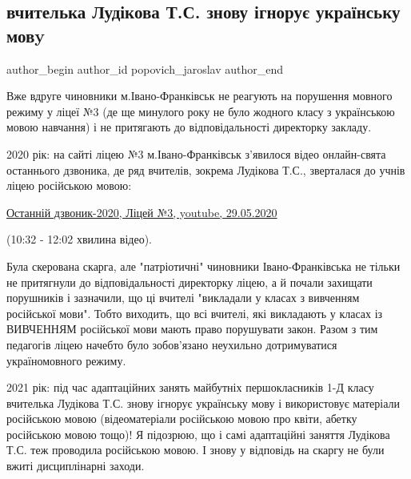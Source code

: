  
 
 
 
 
 
\subsection{вчителька Лудікова Т.С. знову ігнорує українську мовy}
\label{sec:05_08_2021.fb.popovich_jaroslav.1.mova_shkola_ivano_frankovsk}
 
\ifcmt
 author_begin
   author_id popovich_jaroslav
 author_end
\fi

Вже вдруге чиновники м.Івано-Франківськ не реагують на порушення мовного режиму
у ліцеї №3 (де ще минулого року не було жодного класу з українською мовою
навчання) і не притягають до відповідальності директорку закладу. 

2020 рік: на сайті ліцею №3 м.Івано-Франківськ з'явилося відео онлайн-свята
останнього дзвоника, де ряд вчителів, зокрема Лудікова Т.С., зверталася до
учнів ліцею російською мовою:

\href{https://www.youtube.com/watch?v=CPMqfihjQAQ&t=1381s}{%
Останній дзвоник-2020, Ліцей №3, youtube, 29.05.2020%
}

(10:32 - 12:02 хвилина відео). 

Була скерована скарга, але "патріотичні" чиновники Івано-Франківська не тільки
не притягнули до відповідальності директорку ліцею, а й почали захищати
порушників і зазначили, що ці вчителі "викладали у класах з вивченням
російської мови". Тобто виходить, що всі вчителі, які викладають у класах із
ВИВЧЕННЯМ російської мови мають право порушувати закон. Разом з тим педагогів
ліцею начебто було зобов'язано неухильно дотримуватися україномовного режиму.

2021 рік: під час адаптаційних занять майбутніх першокласників 1-Д класу
вчителька Лудікова Т.С. знову ігнорує українську мову і використовує матеріали
російською мовою (відеоматеріали російською мовою про квіти, абетку російською
мовою тощо)! Я підозрюю, що і самі адаптаційні заняття Лудікова Т.С. теж
проводила російською мовою. І знову у відповідь на скаргу не були вжиті
дисциплінарні заходи.

